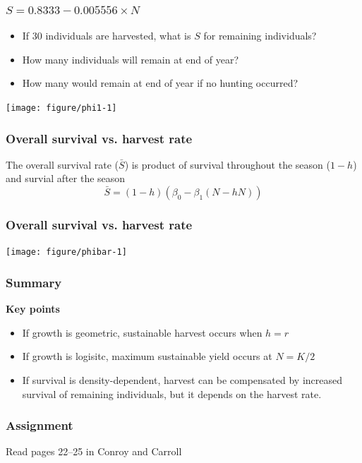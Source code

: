 \documentclass[color=usenames,dvipsnames]{beamer}\usepackage[]{graphicx}\usepackage[]{color}
\begin{document}


\begin{frame}
  \frametitle{$S = 0.8333 - 0.005556 \times N$}
  \begin{itemize}[<+->]
    \item If 30 individuals are harvested, what is $S$ for
      remaining individuals?
    \item How many individuals will remain at end of year?
    \item How many would remain at end of year if no hunting occurred?
  \end{itemize}
  \begin{center}
    \texttt{[image: figure/phi1-1]}
  \end{center}
\end{frame}




\begin{frame}
  \frametitle{Overall survival vs. harvest rate}
  The overall survival rate ($\bar{S}$) is product of survival
  throughout the season ($1-h$) and survial after the season
  \Large
  \[
    \bar{S} = (1-h)(\beta_0 - \beta_1 (N - hN))
  \]
\end{frame}


\begin{frame}[fragile]
  \frametitle{Overall survival vs. harvest rate}
  \vspace{-0.5cm}

\begin{center}
  \texttt{[image: figure/phibar-1]}
\end{center}
\end{frame}




\begin{frame}
  \frametitle{Summary}
  \large
  {\bf Key points}
  \begin{itemize}
    \item If growth is geometric, sustainable harvest occurs when $h=r$
    \item If growth is logisitc, maximum sustainable yield occurs at $N=K/2$
    \item If survival is density-dependent, harvest can be
      compensated by increased survival of remaining individuals, but
      it depends on the harvest rate.
  \end{itemize}
\end{frame}



\begin{frame}
  \frametitle{Assignment}
  \huge \centering
  Read pages 22--25 in Conroy and Carroll
\end{frame}




\end{document}
